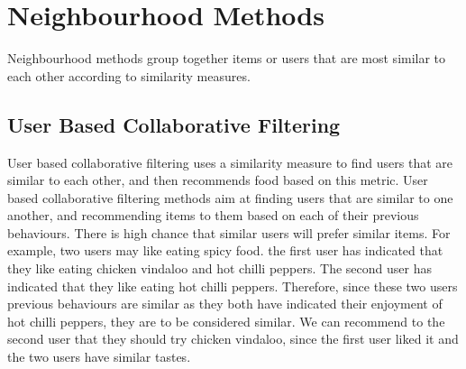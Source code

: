 
\section{Neighbourhood Methods}

Neighbourhood methods group together items or users that are most similar to each other according to similarity measures.

\subsection{User Based Collaborative Filtering}

User based collaborative filtering uses a similarity measure to find users that are similar to each other, and then recommends food based on this metric. User based collaborative filtering methods aim at finding users that are similar to one another, and recommending items to them based on each of their previous behaviours. There is high chance that similar users will prefer similar items. For example, two users may like eating spicy food. the first user has indicated that they like eating chicken vindaloo and hot chilli peppers. The second user has indicated that they like eating hot chilli peppers. Therefore, since these two users previous behaviours are similar as they both have indicated their enjoyment of hot chilli peppers, they are to be considered similar. We can recommend to the second user that they should try chicken vindaloo, since the first user liked it and the two users have similar tastes.  


